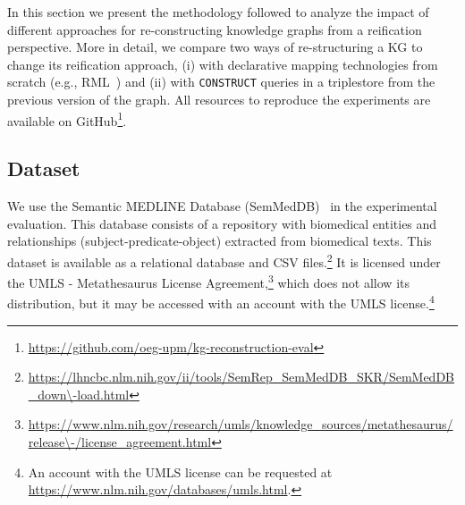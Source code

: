 In this section we present the methodology followed to analyze the impact of different approaches for re-constructing knowledge graphs from a reification perspective. More in detail, we compare two ways of re-structuring a KG to change its reification approach, (i) with declarative mapping technologies from scratch (e.g., RML~\cite{Dimou2014rml,iglesias2023rml}) and (ii) with \texttt{CONSTRUCT} queries in a triplestore from the previous version of the graph. 
All resources to reproduce the experiments are available on GitHub\footnote{\url{https://github.com/oeg-upm/kg-reconstruction-eval}}.



\subsection{Dataset}
\label{sec:chp6-1_dataset}


We use the Semantic MEDLINE Database (SemMedDB)~\cite{SemMedDB} in the experimental evaluation. This database consists of a repository with biomedical entities and relationships (subject-predicate-object) extracted from biomedical texts.
This dataset is available as a relational database and CSV files.\footnote{\url{https://lhncbc.nlm.nih.gov/ii/tools/SemRep\_SemMedDB\_SKR/SemMedDB\_down\-load.html}}
It is licensed under the UMLS - Metathesaurus License Agreement,\footnote{\url{https://www.nlm.nih.gov/research/umls/knowledge\_sources/metathesaurus/release\-/license\_agreement.html}} which does not allow its distribution, but it may be accessed with an account with the UMLS license.\footnote{An account with the UMLS license can be requested at \url{https://www.nlm.nih.gov/databases/umls.html}.}


